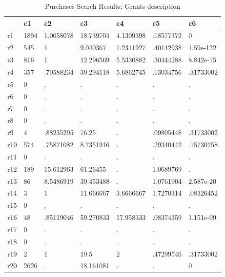 \begin{table}[htbp]
\caption{\label{clabel} Purchases Search Results: Grants description}\centering\medskip
\begin{tabular}{|l|l|l|l|l|l|l|}\hline  
 & c1  & c2  & c3  & c4  & c5  & c6  \\ \hline  
r1 & 1894 & 1.0058078 & 18.739704 & 4.1309398 & .18577372 & 0 \\ \hline 
r2 & 545 & 1 & 9.040367 & 1.2311927 & .40142938 & 1.59e-122 \\ \hline 
r3 & 816 & 1 & 12.296569 & 5.5330882 & .30444288 & 8.842e-15 \\ \hline 
r4 & 357 & .70588234 & 39.294118 & 5.6862745 & .13034756 & .31733002 \\ \hline 
r5 & 0 & . & . & . & . & . \\ \hline 
r6 & 0 & . & . & . & . & . \\ \hline 
r7 & 0 & . & . & . & . & . \\ \hline 
r8 & 0 & . & . & . & . & . \\ \hline 
r9 & 4 & .88235295 & 76.25 & . & .09805448 & .31733002 \\ \hline 
r10 & 574 & .75871082 & 8.7351916 & . & .29340442 & .15730758 \\ \hline 
r11 & 0 & . & . & . & . & . \\ \hline 
r12 & 189 & 15.612963 & 61.26455 & . & 1.0689769 & . \\ \hline 
r13 & 86 & 8.5486919 & 39.453488 & . & 1.0761904 & 2.587e-20 \\ \hline 
r14 & 3 & 1 & 11.666667 & 3.6666667 & 1.7270314 & .08326452 \\ \hline 
r15 & 0 & . & . & . & . & . \\ \hline 
r16 & 48 & .85119046 & 59.270833 & 17.958333 & .08374359 & 1.151e-09 \\ \hline 
r17 & 0 & . & . & . & . & . \\ \hline 
r18 & 0 & . & . & . & . & . \\ \hline 
r19 & 2 & 1 & 19.5 & 2 & .47299546 & .31733002 \\ \hline 
r20 & 2626 & . & 18.161081 & . & . & 0 \\ \hline 
  \end{tabular}
\end{table}
